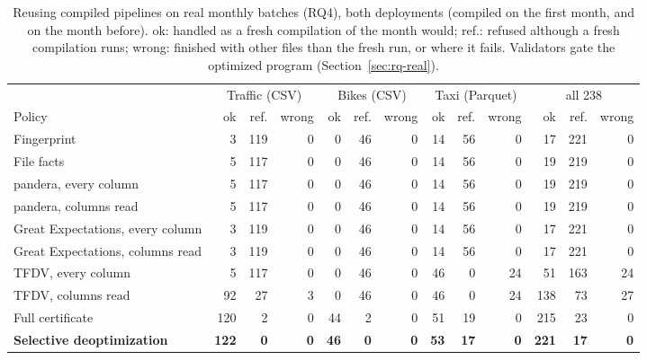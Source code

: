 \begin{table}[t]
\caption{Reusing compiled pipelines on real monthly batches (RQ4), both deployments (compiled on the first month, and on the month before). ok: handled as a fresh compilation of the month would; ref.: refused although a fresh compilation runs; wrong: finished with other files than the fresh run, or where it fails. Validators gate the optimized program (Section~\ref{sec:rq-real}).}
\label{tab:rq-real}
\centering
\footnotesize
\begin{tabular}{@{}lrrrrrrrrrrrr@{}}
\toprule
& \multicolumn{3}{c}{Traffic (CSV)} & \multicolumn{3}{c}{Bikes (CSV)} & \multicolumn{3}{c}{Taxi (Parquet)} & \multicolumn{3}{c}{all 238} \\
\cmidrule(l){2-4}\cmidrule(l){5-7}\cmidrule(l){8-10}\cmidrule(l){11-13}
Policy & ok & ref. & wrong & ok & ref. & wrong & ok & ref. & wrong & ok & ref. & wrong \\
\midrule
Fingerprint & 3 & 119 & 0 & 0 & 46 & 0 & 14 & 56 & 0 & 17 & 221 & 0 \\
File facts & 5 & 117 & 0 & 0 & 46 & 0 & 14 & 56 & 0 & 19 & 219 & 0 \\
pandera, every column & 5 & 117 & 0 & 0 & 46 & 0 & 14 & 56 & 0 & 19 & 219 & 0 \\
pandera, columns read & 5 & 117 & 0 & 0 & 46 & 0 & 14 & 56 & 0 & 19 & 219 & 0 \\
Great Expectations, every column & 3 & 119 & 0 & 0 & 46 & 0 & 14 & 56 & 0 & 17 & 221 & 0 \\
Great Expectations, columns read & 3 & 119 & 0 & 0 & 46 & 0 & 14 & 56 & 0 & 17 & 221 & 0 \\
TFDV, every column & 5 & 117 & 0 & 0 & 46 & 0 & 46 & 0 & 24 & 51 & 163 & 24 \\
TFDV, columns read & 92 & 27 & 3 & 0 & 46 & 0 & 46 & 0 & 24 & 138 & 73 & 27 \\
Full certificate & 120 & 2 & 0 & 44 & 2 & 0 & 51 & 19 & 0 & 215 & 23 & 0 \\
\textbf{Selective deoptimization} & \textbf{122} & \textbf{0} & \textbf{0} & \textbf{46} & \textbf{0} & \textbf{0} & \textbf{53} & \textbf{17} & \textbf{0} & \textbf{221} & \textbf{17} & \textbf{0} \\
\bottomrule
\end{tabular}
\end{table}
